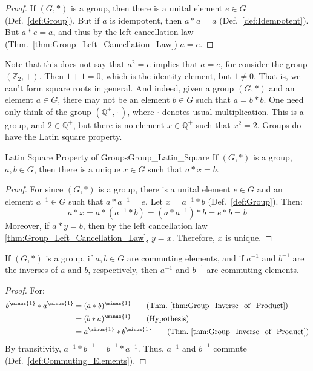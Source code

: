     \begin{proof}
        If $(G,*)$ is a group, then there is a unital element $e\in{G}$
        (Def.~\ref{def:Group}). But if $a$ is idempotent, then $a*a=a$
        (Def.~\ref{def:Idempotent}). But $a*e=a$, and thus by the left
        cancellation law (Thm.~\ref{thm:Group_Left_Cancellation_Law}) $a=e$.
    \end{proof}
    Note that this does not say that $a^{2}=e$ implies that $a=e$, for consider
    the group $(\mathbb{Z}_{2},+)$. Then $1+1=0$, which is the identity element,
    but $1\ne{0}$. That is, we can't form square roots in general. And indeed,
    given a group $(G,*)$ and an element $a\in{G}$, there may not be an element
    $b\in{G}$ such that $a=b*b$. One need only think of the group
    $(\mathbb{Q}^{+},\cdot\,)$, where $\cdot$ denotes usual multiplication.
    This is a group, and $2\in\mathbb{Q}^{+}$, but there is no element
    $x\in\mathbb{Q}^{+}$ such that $x^{2}=2$. Groups do have the Latin square
    property.
    \begin{ltheorem}{Latin Square Property of Groups}{Group_Latin_Square}
        If $(G,*)$ is a group, $a,b\in{G}$, then there is a unique $x\in{G}$
        such that $a*x=b$.
    \end{ltheorem}
    \begin{proof}
        For since $(G,*)$ is a group, there is a unital element $e\in{G}$ and an
        element $a^{\minus{1}}\in{G}$ such that $a*a^{\minus{1}}=e$.
        Let $x=a^{\minus{1}}*b$ (Def.~\ref{def:Group}). Then:
        \begin{equation}
            a*x=a*(a^{\minus{1}}*b)=(a*a^{\minus{1}})*b=e*b=b
        \end{equation}
        Moreover, if $a*y=b$, then by the left cancellation law
        \ref{thm:Group_Left_Cancellation_Law}, $y=x$. Therefore, $x$ is unique.
    \end{proof}
    \begin{theorem}
        \label{thm:Group_Commuting_Elements_Have_Commuting_Inverses}%
        If $(G,*)$ is a group, if $a,b\in{G}$ are commuting elements, and if
        $a^{\minus{1}}$ and $b^{\minus{1}}$ are the inverses of $a$ and $b$,
        respectively, then $a^{\minus{1}}$ and $b^{\minus{1}}$ are commuting
        elements.
    \end{theorem}
    \begin{proof}
        For:
        \begin{align}
            b^{\minus{1}}*a^{\minus{1}}
            &=(a*b)^{\minus{1}}
            \tag{Thm.~\ref{thm:Group_Inverse_of_Product}}\\
            &=(b*a)^{\minus{1}}
            \tag{Hypothesis}\\
            &=a^{\minus{1}}*b^{\minus{1}}
            \tag{Thm.~\ref{thm:Group_Inverse_of_Product}}
        \end{align}
        By transitivity,
        $a^{\minus{1}}*b^{\minus{1}}=b^{\minus{1}}*a^{\minus{1}}$. Thus,
        $a^{\minus{1}}$ and $b^{\minus{1}}$ commute
        (Def.~\ref{def:Commuting_Elements}).
    \end{proof}
